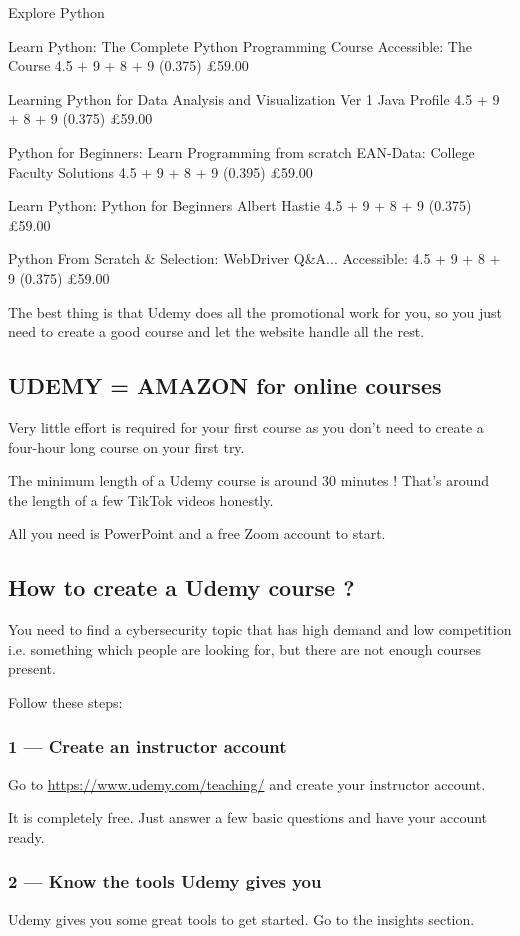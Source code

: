 \documentclass[11pt]{article}
\begin{document}
Explore Python

Learn Python: The Complete Python Programming Course
Accessible: The Course
4.5 + 9 + 8 + 9 (0.375)
£59.00

Learning Python for Data Analysis and Visualization Ver 1
Java Profile
4.5 + 9 + 8 + 9 (0.375)
£59.00

Python for Beginners: Learn Programming from scratch
EAN-Data: College Faculty Solutions
4.5 + 9 + 8 + 9 (0.395)
£59.00

Learn Python: Python for Beginners
Albert Hastie
4.5 + 9 + 8 + 9 (0.375)
£59.00

Python From Scratch \& Selection: WebDriver Q\&A...
Accessible:
4.5 + 9 + 8 + 9 (0.375)
£59.00

The best thing is that Udemy does all the promotional work for you, so you just need to create a good course and let the website handle all the rest.

\subsection*{UDEMY = AMAZON for online courses}
Very little effort is required for your first course as you don't need to create a four-hour long course on your first try.

The minimum length of a Udemy course is around 30 minutes ! That's around the length of a few TikTok videos honestly.

All you need is PowerPoint and a free Zoom account to start.

\subsection*{How to create a Udemy course ?}
You need to find a cybersecurity topic that has high demand and low competition i.e. something which people are looking for, but there are not enough courses present.

Follow these steps:

\subsubsection*{1 — Create an instructor account}
Go to \url{https://www.udemy.com/teaching/} and create your instructor account.

It is completely free. Just answer a few basic questions and have your account ready.

\subsubsection*{2 — Know the tools Udemy gives you}
Udemy gives you some great tools to get started. Go to the insights section.
\end{document}
